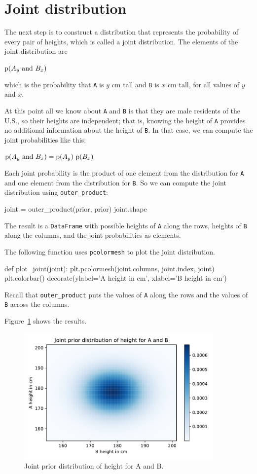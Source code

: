 \documentclass[12pt]{book}
\theoremstyle{exercise}
\newcommand{\py}[1]{{\tt #1}}%
\begin{document}
\section{Joint distribution}

The next step is to construct a distribution that represents the probability of every pair of heights, which is called a joint distribution.
The elements of the joint distribution are

$\mathrm{p}(A_y~\mathrm{and}~B_x)$

which is the probability that \py{A} is $y$ cm tall and \py{B} is $x$ cm tall, for all values of $y$ and $x$.

At this point all we know about \py{A} and \py{B} is that they are male residents of the U.S., so their heights are independent; that is, knowing the height of \py{A} provides no additional information about the height of \py{B}.
In that case, we can compute the joint probabilities like this:

$\mathrm{p}(A_y~\mathrm{and}~B_x) = \mathrm{p}(A_y)~\mathrm{p}(B_x)$

Each joint probability is the product of one element from the distribution for \py{A} and one element from the distribution for \py{B}.
So we can compute the joint distribution using \py{outer_product}:

\begin{code}
joint = outer_product(prior, prior)
joint.shape
\end{code}

The result is a \py{DataFrame} with possible heights of \py{A} along the rows, heights of \py{B} along the columns, and the joint probabilities as elements.

The following function uses \py{pcolormesh} to plot the joint distribution.

\begin{code}
def plot_joint(joint):
    plt.pcolormesh(joint.columns, joint.index, joint)
    plt.colorbar()
    decorate(ylabel='A height in cm',
             xlabel='B height in cm')
\end{code}

Recall that \py{outer_product} puts the values of \py{A} along the rows and the values of \py{B} across the columns.

Figure~\ref{fig09-01} shows the results.

\begin{figure}
\centerline{\includegraphics[width=4in]{figs/fig09-01.pdf}}
\caption{Joint prior distribution of height for A and B.}
\label{fig09-01}
\end{figure}
\end{document}
